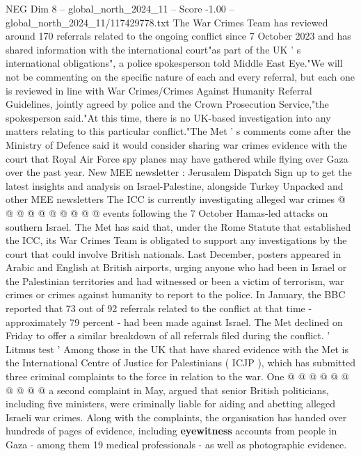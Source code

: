 \begin{textsample}{NEG Dim 8 – global\_north\_2024\_11 – Score -1.00 – global\_north\_2024\_11/117429778.txt}  \label{ex:f8_neg_301}
The War Crimes Team has reviewed around 170 referrals related to the ongoing conflict since 7 October 2023 and has shared information with the international court"as part of the UK ' s international obligations", a police spokesperson told Middle East Eye."We will not be commenting on the specific nature of each and every referral, but each one is reviewed in line with War Crimes/Crimes Against Humanity Referral Guidelines, jointly agreed by police and the Crown Prosecution Service,"the spokesperson said."At this time, there is no UK-based investigation into any matters relating to this particular conflict."The Met ' s comments come after the Ministry of Defence said it would consider sharing war crimes evidence with the court that Royal Air Force spy planes may have gathered while flying over Gaza over the past year.
New MEE newsletter : Jerusalem Dispatch Sign up to get the latest insights and analysis on Israel-Palestine, alongside Turkey Unpacked and other MEE newsletters The ICC is currently investigating alleged war crimes @ @ @ @ @ @ @ @ @ @ events following the 7 October Hamas-led attacks on southern Israel.
The Met has said that, under the Rome Statute that established the ICC, its War Crimes Team is obligated to support any investigations by the court that could involve British nationals.
Last December, posters appeared in Arabic and English at British airports, urging anyone who had been in Israel or the Palestinian territories and had witnessed or been a victim of terrorism, war crimes or crimes against humanity to report to the police.
In January, the BBC reported that 73 out of 92 referrals related to the conflict at that time - approximately 79 percent - had been made against Israel.
The Met declined on Friday to offer a similar breakdown of all referrals filed during the conflict. ' Litmus test ' Among those in the UK that have shared evidence with the Met is the International Centre of Justice for Palestinians ( ICJP ), which has submitted three criminal complaints to the force in relation to the war.
One @ @ @ @ @ @ @ @ @ @ a second complaint in May, argued that senior British politicians, including five ministers, were criminally liable for aiding and abetting alleged Israeli war crimes.
Along with the complaints, the organisation has handed over hundreds of pages of evidence, including \textbf{eyewitness} accounts from people in Gaza - among them 19 medical professionals - as well as photographic evidence.

\end{textsample}
